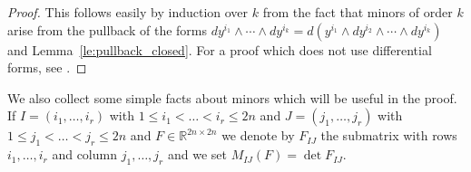 \documentclass[titlepage]{amsart}
\numberwithin{equation}{section}
\theoremstyle{plain}
\theoremstyle{definition}
\theoremstyle{remark}
\newcommand{\R}{\mathbb{R}}
\begin{document}
\begin{proof} 
This follows easily by induction over $k$ from the   fact that minors of order $k$ arise from the pullback of  the forms $dy^{i_1} \wedge \cdots \wedge dy^{i_k} = d(y^{i_1} \wedge dy^{i_2} \wedge \cdots \wedge dy^{i_k})$ and Lemma~\ref{le:pullback_closed}. For a proof which does not use differential forms,   see 
\cite[Theorem 8.20]{dacorogna_book08}.
\end{proof}

We also collect  some simple facts about minors which will be useful in the proof. 
If $I =(i_1, \ldots, i_r)$ with $1 \le i_1 < \ldots < i_r \le 2n$  and $J = (j_1, \ldots, j_r)$ with
$1 \le j_1 < \ldots < j_r \le 2n$  and  $F \in \R^{2n \times 2n}$ we denote by $F_{IJ}$ the submatrix
with rows $i_1, \ldots, i_r$ and column $j_1, \ldots, j_r$ and we set
$M_{IJ}(F) = \det F_{IJ}$. 
\end{document}
